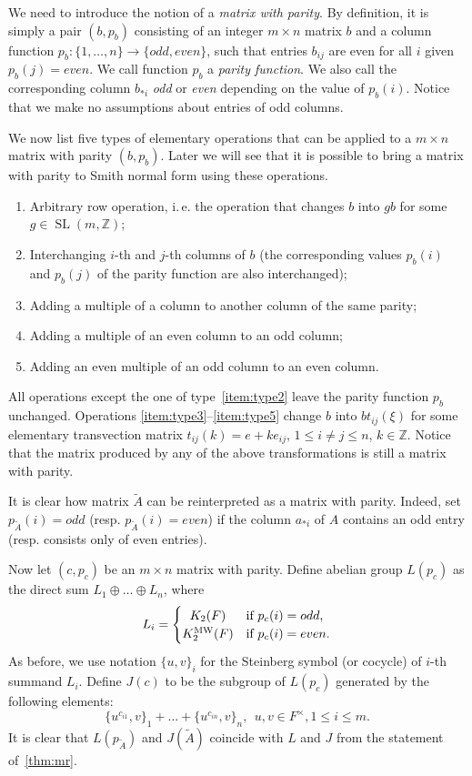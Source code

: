 \documentclass[oneside, 10pt]{amsart}
\theoremstyle{plain}
\theoremstyle{remark}
\theoremstyle{definition}
\DeclareMathOperator{\SL}{SL}
\newcommand{\ZZ}{\mathbb{Z}}
\newcommand{\K}{K_2}
\newcommand{\Kmw}{K^{\mathrm{MW}}_2}
\begin{document}
We need to introduce the notion of a {\it matrix with parity}.
By definition, it is simply a pair $(b, p_b)$ consisting of an integer $m\times n$ matrix $b$ and a column function $p_b\colon \{1,\ldots,n\}\to \{odd, even\}$,
 such that entries $b_{ij}$ are even for all $i$ given $p_b(j)=even$.
We call function $p_b$ a {\it parity function}.
We also call the corresponding column $b_{*i}$ {\it odd} or {\it even} depending on the value of $p_b(i)$.
Notice that we make no assumptions about entries of odd columns.

We now list five types of elementary operations that can be applied to a $m \times n$ matrix with parity $(b, p_b)$.
Later we will see that it is possible to bring a matrix with parity to Smith normal form using these operations.
\begin{enumerate}
 \item \label{item:type1} Arbitrary row operation, i.\,e. the operation that changes $b$ into $gb$ for some $g \in \SL(m, \ZZ)$;
 \item \label{item:type2} Interchanging $i$-th and $j$-th columns of $b$ 
  (the corresponding values $p_b(i)$ and $p_b(j)$ of the parity function are also interchanged);
 \item \label{item:type3} Adding a multiple of a column to another column of the same parity;
 \item \label{item:type4} Adding a multiple of an even column to an odd column;
 \item \label{item:type5} Adding an even multiple of an odd column to an even column.
\end{enumerate}
All operations except the one of type~\eqref{item:type2} leave the parity function $p_b$ unchanged.
Operations \eqref{item:type3}--\eqref{item:type5} change $b$ into $bt_{ij}(\xi)$
 for some elementary transvection matrix $t_{ij}(k) =e+k e_{ij}$, $1\leq i\neq j\leq n$, $k \in \ZZ$.
Notice that the matrix produced by any of the above transformations is still a matrix with parity.

It is clear how matrix $\widetilde{A}$ can be reinterpreted as a matrix with parity.
Indeed, set $p_{\widetilde{A}}(i) = odd$ (resp. $p_{\widetilde{A}}(i) = even$) if the column $a_{*i}$ of
 $A$ contains an odd entry (resp. consists only of even entries).

Now let $(c, p_c)$ be an $m\times n$ matrix with parity.
Define abelian group $L(p_c)$ as the direct sum $L_1 \oplus \ldots \oplus L_n$, where 
\[L_i=\left\{\def\arraystretch{1.2}%
  \begin{array}{@{}c@{\quad}l@{}}
     \K(F) & \text{if $p_c(i) = odd$,} \\    
     \Kmw(F) & \text{if $p_c(i) = even$}.
  \end{array}\right.\]
As before, we use notation $\{u, v\}_i$ for the Steinberg symbol (or cocycle) of $i$-th summand $L_i$.
Define $J(c)$ to be the subgroup of $L(p_c)$ generated by the following elements:
\[ \{ u^{c_{i1}}, v\}_1 + \ldots + \{u^{c_{in}}, v\}_{n},\ \ u, v\in F^\times, 1\leq i \leq m.\]
It is clear that $L(p_{\widetilde{A}})$ and $J({\widetilde{A}})$ coincide with $L$ and $J$ from the statement of~\cref{thm:mr}.
\end{document}
